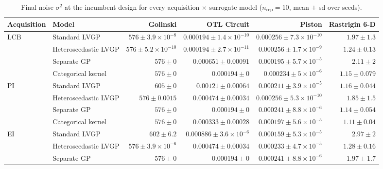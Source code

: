 \begin{table}[htbp]
\centering
\small
\setlength{\tabcolsep}{4pt}
\setlength{\fboxsep}{2pt}
\caption{Final noise $\sigma^2$ at the incumbent design for every acquisition $\times$ surrogate model ($n_{\mathrm{rep}}=10$, mean $\pm$ sd over seeds).}
\label{tab:noise_nrep10}
\begin{tabular}{llrrrr}
\toprule
Acquisition & Model & Golinski & OTL Circuit & Piston & Rastrigin 6-D \\
\midrule
LCB & Standard LVGP & $576 \pm 3.9{\times}10^{-8}$ & $0.000194 \pm 1.4{\times}10^{-10}$ & $0.000256 \pm 7.3{\times}10^{-10}$ & $1.97 \pm 1.3$ \\
 & Heteroscedastic LVGP & $576 \pm 5.2{\times}10^{-10}$ & $0.000194 \pm 2.7{\times}10^{-11}$ & $0.000256 \pm 1.7{\times}10^{-9}$ & $1.24 \pm 0.13$ \\
 & Separate GP & \colorbox{green!20}{{\boldmath$576 \pm 0$}} & $0.000651 \pm 0.00091$ & {\boldmath$0.000195 \pm 5.7{\times}10^{-5}$} & $2.11 \pm 2$ \\
 & Categorical kernel & \colorbox{green!20}{{\boldmath$576 \pm 0$}} & \colorbox{green!20}{{\boldmath$0.000194 \pm 0$}} & $0.000234 \pm 5{\times}10^{-6}$ & {\boldmath$1.15 \pm 0.079$} \\
\midrule
PI & Standard LVGP & $605 \pm 0$ & $0.00121 \pm 0.00064$ & $0.000211 \pm 3.9{\times}10^{-5}$ & $1.16 \pm 0.044$ \\
 & Heteroscedastic LVGP & $576 \pm 0.0015$ & $0.000474 \pm 0.00034$ & $0.000256 \pm 5.3{\times}10^{-10}$ & $1.85 \pm 1.5$ \\
 & Separate GP & \colorbox{green!20}{{\boldmath$576 \pm 0$}} & \colorbox{green!20}{{\boldmath$0.000194 \pm 0$}} & $0.000241 \pm 8.8{\times}10^{-6}$ & $1.14 \pm 0.054$ \\
 & Categorical kernel & \colorbox{green!20}{{\boldmath$576 \pm 0$}} & $0.000333 \pm 0.00028$ & {\boldmath$0.000197 \pm 5.6{\times}10^{-5}$} & {\boldmath$1.11 \pm 0.04$} \\
\midrule
EI & Standard LVGP & $602 \pm 6.2$ & $0.000886 \pm 3.6{\times}10^{-6}$ & {\boldmath$0.000159 \pm 5.3{\times}10^{-5}$} & $2.97 \pm 2$ \\
 & Heteroscedastic LVGP & $576 \pm 3.9{\times}10^{-6}$ & $0.000474 \pm 0.00034$ & $0.000233 \pm 4.7{\times}10^{-5}$ & $1.28 \pm 0.16$ \\
 & Separate GP & \colorbox{green!20}{{\boldmath$576 \pm 0$}} & \colorbox{green!20}{{\boldmath$0.000194 \pm 0$}} & $0.000241 \pm 8.8{\times}10^{-6}$ & $1.97 \pm 1.7$ \\

\end{tabular}
\end{table}

